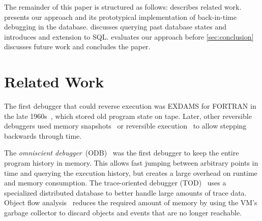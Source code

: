 \documentclass[english,conference]{IEEEtran}
\begin{document}
The remainder of this paper is structured as follows:
 describes related work. 
 presents our approach and its prototypical implementation of back-in-time debugging in the database.
 discusses querying past database states and introduces and extension to SQL.
 evaluates our approach before \cref{sec:conclusion} discusses future work and concludes the paper.


\section{Related Work}
\label{sec:relatedWork}

The first debugger that could reverse execution was EXDAMS for FORTRAN in the late 1960s~\cite{balzer_exdams:_1969}, which stored old program state on tape.
Later, other reversible debuggers used memory snapshots~\cite{feldman_igor:_1988} or reversible execution~\cite{lieberman1997zstep} to allow stepping backwards through time.

The \emph{omniscient debugger}~(ODB)~\cite{lewis_debugging_2003} was the first debugger to keep the entire program history in memory.
This allows fast jumping between arbitrary points in time and querying the execution history, but creates a large overhead on runtime and memory consumption.
The trace-oriented  debugger (TOD)~\cite{pothier_scalable_2007} uses a specialized distributed database to better handle large amounts of trace data.
Object  flow  analysis~\cite{lienhard_practical_2008} reduces the required amount of memory by using the VM's garbage collector to discard objects and events that are no longer reachable.

\end{document}
